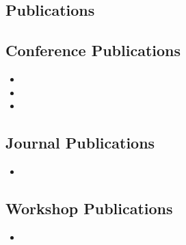 \begin{appendices}
\chapter{Publications}
\section{Conference Publications}
\begin{itemize}
	\item %
	\item %
	\item %
\end{itemize}

\section{Journal Publications}
\begin{itemize}
				\item %
\end{itemize}

\section{Workshop Publications}
\begin{itemize}
	\item %
\end{itemize}

\end{appendices}
